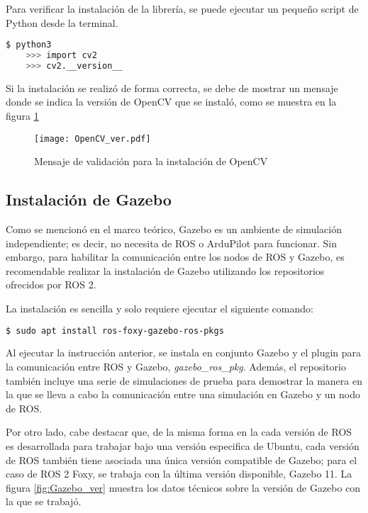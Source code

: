 Para verificar la instalación de la librería, se puede ejecutar un pequeño script de Python desde la terminal.

\begin{lstlisting}[language = bash]
    $ python3
    >>> import cv2
    >>> cv2.__version__
\end{lstlisting}

Si la instalación se realizó de forma correcta, se debe de mostrar un mensaje donde se indica la versión de OpenCV que se instaló, como se muestra en la figura \ref{fig:OpenCV_ver}

\begin{figure}[ht]
    \centering
    \texttt{[image: OpenCV\_ver.pdf]}
    \caption{Mensaje de validación para la instalación de OpenCV}
    \label{fig:OpenCV_ver}
\end{figure}

\subsection{Instalación de Gazebo}

Como se mencionó en el marco teórico, Gazebo es un ambiente de simulación independiente; es decir, no necesita de ROS o ArduPilot para funcionar. Sin embargo, para habilitar la comunicación entre los nodos de ROS y Gazebo, es recomendable realizar la instalación de Gazebo utilizando los repositorios ofrecidos por ROS 2.

La instalación es sencilla y solo requiere ejecutar el siguiente comando:

\begin{lstlisting}[language = bash]
    $ sudo apt install ros-foxy-gazebo-ros-pkgs
\end{lstlisting}

Al ejecutar la instrucción anterior, se instala en conjunto Gazebo y el plugin para la comunicación entre ROS y Gazebo, \textit{gazebo\_ros\_pkg}. Además, el repositorio también incluye una serie de simulaciones de prueba para demostrar la manera en la que se lleva a cabo la comunicación entre una simulación en Gazebo y un nodo de ROS. 

Por otro lado, cabe destacar que, de la misma forma en la cada versión de ROS es desarrollada para trabajar bajo una versión especifica de Ubuntu, cada versión de ROS también tiene asociada una única versión compatible de Gazebo; para el caso de ROS 2 Foxy, se trabaja con la última versión disponible, Gazebo 11. La figura \ref{fig:Gazebo_ver} muestra los datos técnicos sobre la versión de Gazebo con la que se trabajó.

